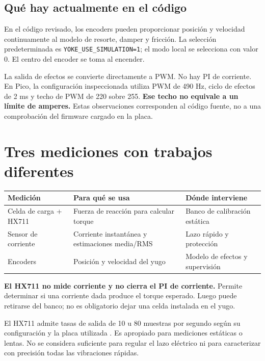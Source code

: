 \documentclass[11pt,a4paper]{article}
\begin{document}
\subsection{Qué hay actualmente en el código}
En el código revisado, los encoders pueden proporcionar posición y velocidad continuamente al modelo de resorte, damper y fricción. La selección predeterminada es \texttt{YOKE\_USE\_SIMULATION=1}; el modo local se selecciona con valor 0. El centro del encoder se toma al encender.

La salida de efectos se convierte directamente a PWM. No hay PI de corriente. En Pico, la configuración inspeccionada utiliza PWM de 490 Hz, ciclo de efectos de 2 ms y techo de PWM de 220 sobre 255. \textbf{Ese techo no equivale a un límite de amperes.} Estas observaciones corresponden al código fuente, no a una comprobación del firmware cargado en la placa.

\section{Tres mediciones con trabajos diferentes}
\begin{center}
\begin{tabularx}{\textwidth}{lXX}
\toprule
Medición & Para qué se usa & Dónde interviene\\
\midrule
Celda de carga + HX711 & Fuerza de reacción para calcular torque & Banco de calibración estática\\
Sensor de corriente & Corriente instantánea y estimaciones media/RMS & Lazo rápido y protección\\
Encoders & Posición y velocidad del yugo & Modelo de efectos y supervisión\\
\bottomrule
\end{tabularx}
\end{center}
\textbf{El HX711 no mide corriente y no cierra el PI de corriente.} Permite determinar si una corriente dada produce el torque esperado. Luego puede retirarse del banco; no es obligatorio dejar una celda instalada en el yugo.

El HX711 admite tasas de salida de 10 u 80 muestras por segundo según su configuración y la placa utilizada \cite{hx}. Es apropiado para mediciones estáticas o lentas. No se considera suficiente para regular el lazo eléctrico ni para caracterizar con precisión todas las vibraciones rápidas.
\end{document}
